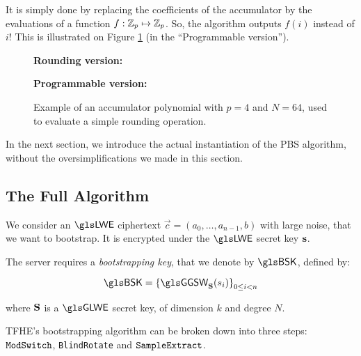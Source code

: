 It is simply done by replacing the coefficients of the accumulator by the evaluations of a function $f:\mathbb{Z}_p \mapsto \mathbb{Z}_p$. So, the algorithm outputs $f(i)$ instead of $i$! This is illustrated on Figure \ref{fig:illustration_accumulator} (in the ``Programmable version'').


\begin{figure}
	\centering
	
	
	\vspace{1.5em}
	
	\textbf{Rounding version:}\\[0.5em]
	
	\vspace{1.5em}
	
	\textbf{Programmable version:}\\[0.5em]
	
	\caption{Example of an accumulator polynomial with $p=4$ and $N=64$, used to evaluate a simple rounding operation.}
	\label{fig:illustration_accumulator}
\end{figure}

\bigskip

In the next section, we introduce the actual instantiation of the \gls{PBS} algorithm, without the oversimplifications we made in this section.

\subsection{The Full Algorithm}
\label{sec:pbs_algorithm}

We consider an $\LWE$ ciphertext $\vec c = (a_0, \dots, a_{n-1}, b)$ with large noise, that we want to bootstrap. It is encrypted under the $\LWE$ secret key $\mathbf s$. 

The server requires a \textit{bootstrapping key}, that we denote by $\BSK$, defined by:

\[
	\BSK = \left \lbrace \GGSW_{\glweSecretKey}(s_i) \right \rbrace_{0 \le i < n}
\]

\noindent
where $\mathbf S$ is a $\GLWE$ secret key, of dimension $k$ and degree $N$.

\bigskip
\gls{TFHE}'s bootstrapping algorithm can be broken down into three steps: $\texttt{ModSwitch}$, \texttt{BlindRo\-tate} and $\texttt{SampleExtract}$.

